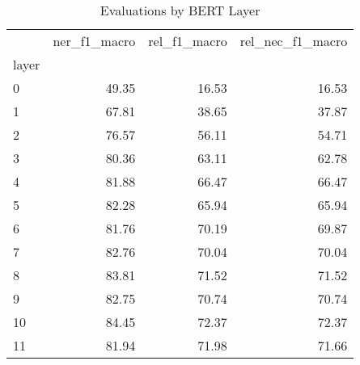 \begin{table}
\centering
\caption{Evaluations by BERT Layer}
\label{tab:bert-layers}
\begin{tabular}{lrrr}
\toprule
{} &  ner\_f1\_macro &  rel\_f1\_macro &  rel\_nec\_f1\_macro \\
layer &               &               &                   \\
\midrule
0     &         49.35 &         16.53 &             16.53 \\
1     &         67.81 &         38.65 &             37.87 \\
2     &         76.57 &         56.11 &             54.71 \\
3     &         80.36 &         63.11 &             62.78 \\
4     &         81.88 &         66.47 &             66.47 \\
5     &         82.28 &         65.94 &             65.94 \\
6     &         81.76 &         70.19 &             69.87 \\
7     &         82.76 &         70.04 &             70.04 \\
8     &         83.81 &         71.52 &             71.52 \\
9     &         82.75 &         70.74 &             70.74 \\
10    &         84.45 &         72.37 &             72.37 \\
11    &         81.94 &         71.98 &             71.66 \\
\bottomrule
\end{tabular}
\end{table}
